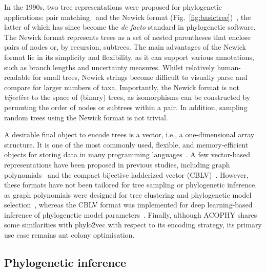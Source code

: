 In the 1990s, two tree representations were proposed for phylogenetic applications: pair matching~\cite{diaconis1998} and the Newick format (Fig.~\ref{fig:basictree})~\cite{olsen1990, felsenstein2004}, the latter of which has since become the \textit{de facto} standard in phylogenetic software. The Newick format represents trees as a set of nested parentheses that enclose pairs of nodes or, by recursion, subtrees. The main advantages of the Newick format lie in its simplicity and flexibility, as it can support various annotations, such as branch lengths and uncertainty measures. Whilst relatively human-readable for small trees, Newick strings become difficult to visually parse and compare for larger numbers of taxa. Importantly, the Newick format is not \emph{bijective} to the space of (binary) trees, as isomorphisms can be constructed by permuting the order of nodes or subtrees within a pair. In addition, sampling random trees using the Newick format is not trivial.

A desirable final object to encode trees is a vector, i.e., a one-dimensional array structure. It is one of the most commonly used, flexible, and memory-efficient objects for storing data in many programming languages~\cite{stroustrup2013, harris2020, cormen2022}. A few vector-based representations have been proposed in previous studies, including graph polynomials~\cite{liu2021, liu2022} and the compact bijective ladderized vector (CBLV)~\cite{voznica2022}. However, these formats have not been tailored for tree sampling or phylogenetic inference, as graph polynomials were designed for tree clustering and phylogenetic model selection~\cite{liu2021, liu2022}, whereas the CBLV format was implemented for deep learning-based inference of phylogenetic model parameters~\cite{voznica2022}. Finally, although ACOPHY \cite{dinh2010} shares some similarities with phylo2vec with respect to its encoding strategy, its primary use case remains ant colony optimisation.

\subsection{Phylogenetic inference}
\label{sec:bkg_phylo_inference}

